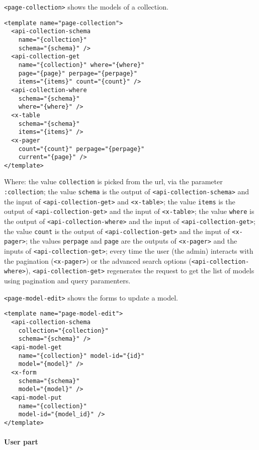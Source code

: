 \vspace{0.2cm}

\texttt{<page-collection>} shows the models of a collection.

\begin{lstlisting}[language=HTML5]
<template name="page-collection">
  <api-collection-schema
    name="{collection}"
    schema="{schema}" />
  <api-collection-get 
    name="{collection}" where="{where}" 
    page="{page}" perpage="{perpage}"  
    items="{items}" count="{count}" />
  <api-collection-where 
    schema="{schema}"
    where="{where}" />
  <x-table 
    schema="{schema}"
    items="{items}" />
  <x-pager 
    count="{count}" perpage="{perpage}"
    current="{page}" />
</template>
\end{lstlisting}

Where: 
the value \texttt{collection} is picked from the url, via the parameter \texttt{:collection};
the value \texttt{schema} is the output of \texttt{<api-collection-schema>} and the input of \texttt{<api-collection-get>} and \texttt{<x-table>};
the value \texttt{items} is the output of \texttt{<api-collection-get>} and the input of \texttt{<x-table>};
the value \texttt{where} is the output of \texttt{<api-collection-where>} and the input of \texttt{<api-collection-get>};
the value \texttt{count} is the output of \texttt{<api-collection-get>} and the input of \texttt{<x-pager>};
the values \texttt{perpage} and \texttt{page} are the outputs of \texttt{<x-pager>} and the inputs of \texttt{<api-collection-get>};
every time the user (the admin) interacts with the pagination (\texttt{<x-pager>}) or the advanced search options (\texttt{<api-collection-where>}), \texttt{<api-collection-get>} regenerates the request to get the list of models using pagination and query paramenters.

\vspace{0.2cm}

\texttt{<page-model-edit>} shows the forms to update a model.

\begin{lstlisting}[language=HTML5]
<template name="page-model-edit">
  <api-collection-schema
    collection="{collection}"
    schema="{schema}" />
  <api-model-get 
    name="{collection}" model-id="{id}"
    model="{model}" />
  <x-form 
    schema="{schema}" 
    model="{model}" />
  <api-model-put 
    name="{collection}"
    model-id="{model_id}" />
</template>
\end{lstlisting}

\paragraph{User part}

